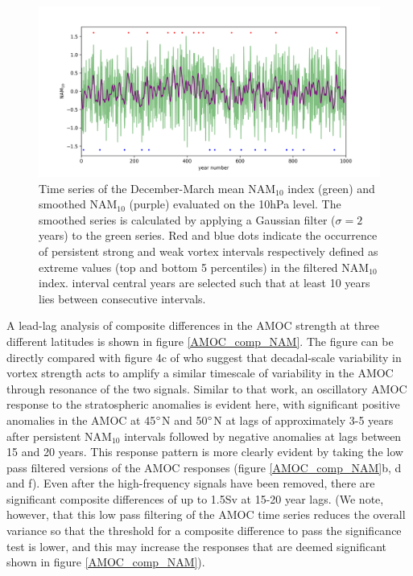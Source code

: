 \begin{figure}[h!]
\begin{center}
\noindent\includegraphics[width = \linewidth]{Figures/Figures-surface/NAM_and_filtered.png} 
\caption[Time series of the December-March mean NAM$_{10}$ index and smoothed NAM$_{10}$]{Time series of the December-March mean NAM$_{10}$ index (green) and smoothed NAM$_{10}$ (purple) evaluated on the 10hPa level. The smoothed series is calculated by applying a Gaussian filter ($\sigma = 2$ years) to the green series. Red and blue dots indicate the occurrence of persistent strong and weak vortex intervals respectively defined as extreme values (top and bottom 5 percentiles) in the filtered NAM$_{10}$ index. interval central years are selected such that at least 10 years lies between consecutive intervals.}
\label{NAM_and_filtered}
\end{center}
\end{figure}

A lead-lag analysis of composite differences in the AMOC strength at three different latitudes is shown in figure \ref{AMOC_comp_NAM}. The figure can be directly compared with figure 4c of \cite{reichlerStratospheric2012b} who suggest that decadal-scale variability in vortex strength acts to amplify a similar timescale of variability in the AMOC through resonance of the two signals. Similar to that work, an oscillatory AMOC response to the stratospheric anomalies is evident here, with significant positive anomalies in the AMOC at 45$\degree$N and 50$\degree$N at lags of approximately 3-5 years after persistent NAM$_{10}$ intervals followed by negative anomalies at lags between 15 and 20 years. This response pattern is more clearly evident by taking the low pass filtered versions of the AMOC responses (figure \ref{AMOC_comp_NAM}b, d and f). Even after the high-frequency signals have been removed, there are significant composite differences of up to 1.5Sv at 15-20 year lags. (We note, however, that this low pass filtering of the AMOC time series reduces the overall variance so that the threshold for a composite difference to pass the significance test is lower, and this may increase the responses that are deemed significant shown in figure \ref{AMOC_comp_NAM}). 


